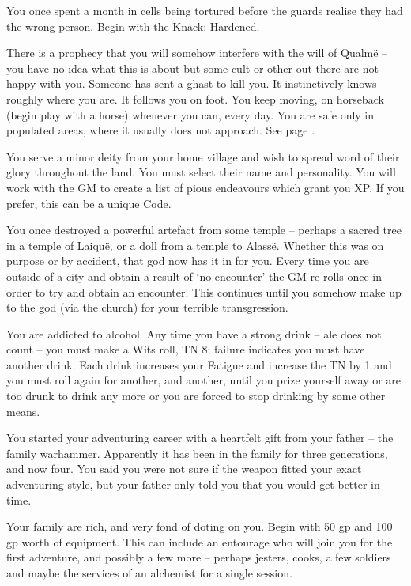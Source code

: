 \begin{multicols}{2}
\begin{list}{\addtocounter{list}{1}\textbf{:}}{\raggedleft}
\item{You once spent a month in cells being tortured before the guards realise they had the wrong person.  Begin with the Knack: Hardened.}

\item{There is a prophecy that you will somehow interfere with the will of Qualm\"{e} -- you have no idea what this is about but some cult or other out there are not happy with you.  Someone has sent a ghast to kill you.  It instinctively knows roughly where you are.  It follows you on foot. You keep moving, on horseback (begin play with a horse) whenever you can, every day.  You are safe only in populated areas, where it usually does not approach.  See page \pageref{ghast}.}

\item{You serve a minor deity from your home village and wish to spread word of their glory throughout the land.  You must select their name and personality.  You will work with the GM to create a list of pious endeavours which grant you XP.  If you prefer, this can be a unique Code.}

\item{You once destroyed a powerful artefact from some temple -- perhaps a sacred tree in a temple of Laiqu\"{e}, or a doll from a temple to Alass\"e.
Whether this was on purpose or by accident, that god now has it in for you.  Every time you are outside of a city and obtain a result of `no encounter' the GM re-rolls once in order to try and obtain an encounter.
This continues until you somehow make up to the god (via the church) for your terrible transgression.}

\item{You are addicted to alcohol.  Any time you have a strong drink -- ale does not count -- you must make a Wits roll, TN 8; failure indicates you must have another drink.  Each drink increases your Fatigue and increase the TN by 1 and you must roll again for another, and another, until you prize yourself away or are too drunk to drink any more or you are forced to stop drinking by some other means.}

\item{You started your adventuring career with a heartfelt gift from your father -- the family warhammer.  Apparently it has been in the family for three generations, and now four.  You said you were not sure if the weapon fitted your exact adventuring style, but your father only told you that you would get better in time.}

\item{Your family are rich, and very fond of doting on you.  Begin with 50 gp and 100 gp worth of equipment.  This can include an entourage who will join you for the first adventure, and possibly a few more -- perhaps jesters, cooks, a few soldiers and maybe the services of an alchemist for a single session.}


\end{list}
\end{multicols}
